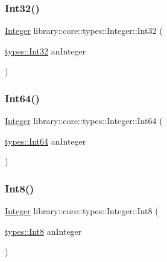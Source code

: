 \subsubsection{\texorpdfstring{Int32()}{Int32()}}
{\footnotesize\ttfamily \hyperlink{classlibrary_1_1core_1_1types_1_1_integer}{Integer} library\+::core\+::types\+::\+Integer\+::\+Int32 (\begin{DoxyParamCaption}\item[{\hyperlink{namespacelibrary_1_1core_1_1types_acaf2598d96f2239dc55e54628da77876}{types\+::\+Int32}}]{an\+Integer }\end{DoxyParamCaption})\hspace{0.3cm}{\ttfamily [static]}}

\mbox{\label{classlibrary_1_1core_1_1types_1_1_integer_a24c417fe94624194efd4d3ffc301c0b3}} 
\subsubsection{\texorpdfstring{Int64()}{Int64()}}
{\footnotesize\ttfamily \hyperlink{classlibrary_1_1core_1_1types_1_1_integer}{Integer} library\+::core\+::types\+::\+Integer\+::\+Int64 (\begin{DoxyParamCaption}\item[{\hyperlink{namespacelibrary_1_1core_1_1types_aaa5045e0d51ac9cff3c0aeff2b792c8c}{types\+::\+Int64}}]{an\+Integer }\end{DoxyParamCaption})\hspace{0.3cm}{\ttfamily [static]}}

\mbox{\label{classlibrary_1_1core_1_1types_1_1_integer_ae0a1da7739a3990f61ee8a56b3f4cd6a}} 
\subsubsection{\texorpdfstring{Int8()}{Int8()}}
{\footnotesize\ttfamily \hyperlink{classlibrary_1_1core_1_1types_1_1_integer}{Integer} library\+::core\+::types\+::\+Integer\+::\+Int8 (\begin{DoxyParamCaption}\item[{\hyperlink{namespacelibrary_1_1core_1_1types_a31bb31acb8e07271b66571cf8e6eafee}{types\+::\+Int8}}]{an\+Integer }\end{DoxyParamCaption})\hspace{0.3cm}{\ttfamily [static]}}

